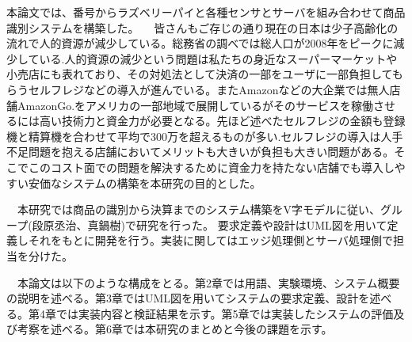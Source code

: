 本論文では、番号からラズベリーパイと各種センサとサーバを組み合わせて商品識別システムを構築した。
　皆さんもご存じの通り現在の日本は少子高齢化の流れで人的資源が減少している。総務省の調べでは総人口が2008年をピークに減少している\cite{population}.人的資源の減少という問題は私たちの身近なスーパーマーケットや小売店にも表れており、その対処法として決済の一部をユーザに一部負担してもらうセルフレジなどの導入が進んでいる。またAmazonなどの大企業では無人店舗AmazonGo\cite{amazongo}.をアメリカの一部地域で展開しているがそのサービスを稼働させるには高い技術力と資金力が必要となる。先ほど述べたセルフレジの金額も登録機と精算機を合わせて平均で300万を超えるものが多い\cite{self_register}.セルフレジの導入は人手不足問題を抱える店舗においてメリットも大きいが負担も大きい問題がある。そこでこのコスト面での問題を解決するために資金力を持たない店舗でも導入しやすい安価なシステムの構築を本研究の目的とした。

　本研究では商品の識別から決算までのシステム構築をV字モデルに従い、グループ(段原丞治、真鍋樹)で研究を行った。
要求定義や設計はUML図を用いて定義しそれをもとに開発を行う。実装に関してはエッジ処理側とサーバ処理側で担当を分けた。

　本論文は以下のような構成をとる。第2章では用語、実験環境、システム概要の説明を述べる。第3章ではUML図を用いてシステムの要求定義、設計を述べる。第4章では実装内容と検証結果を示す。第5章では実装したシステムの評価及び考察を述べる。第6章では本研究のまとめと今後の課題を示す。